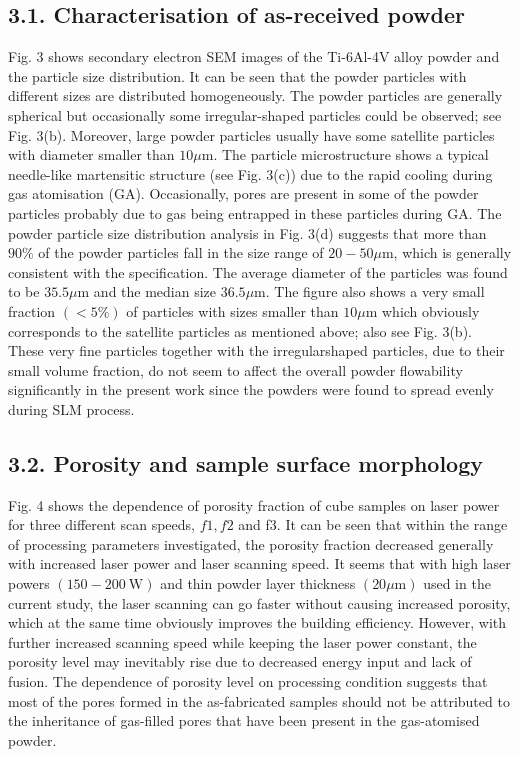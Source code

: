 \documentclass[10pt]{article}
\begin{document}
\subsection*{3.1. Characterisation of as-received powder}
Fig. 3 shows secondary electron SEM images of the Ti-6Al-4V alloy powder and the particle size distribution. It can be seen that the powder particles with different sizes are distributed homogeneously. The powder particles are generally spherical but occasionally some irregular-shaped particles could be observed; see Fig. 3(b). Moreover, large powder particles usually have some satellite particles with diameter smaller than $10 \mu \mathrm{m}$. The particle microstructure shows a typical needle-like martensitic structure (see Fig. 3(c)) due to the rapid cooling during gas atomisation (GA). Occasionally, pores are present in some of the powder particles probably due to gas being entrapped in these particles during GA. The powder particle size distribution analysis in Fig. 3(d) suggests that more than $90 \%$ of the powder particles fall in the size range of $20-50 \mu \mathrm{m}$, which is generally consistent with the specification. The average diameter of the particles was found to be $35.5 \mu \mathrm{m}$ and the median size $36.5 \mu \mathrm{m}$. The figure also shows a very small fraction $(<5 \%)$ of particles with sizes smaller than $10 \mu \mathrm{m}$ which obviously corresponds to the satellite particles as mentioned above; also see Fig. 3(b). These very fine particles together with the irregularshaped particles, due to their small volume fraction, do not seem to affect the overall powder flowability significantly in the present work since the powders were found to spread evenly during SLM process.

\subsection*{3.2. Porosity and sample surface morphology}
Fig. 4 shows the dependence of porosity fraction of cube samples on laser power for three different scan speeds, $f 1, f 2$ and f3. It can be seen that within the range of processing parameters investigated, the porosity fraction decreased generally with increased laser power and laser scanning speed. It seems that with high laser powers $(150-200 \mathrm{~W})$ and thin powder layer thickness $(20 \mu \mathrm{m})$ used in the current study, the laser scanning can go faster without causing increased porosity, which at the same time obviously improves the building efficiency. However, with further increased scanning speed while keeping the laser power constant, the porosity level may inevitably rise due to decreased energy input and lack of fusion. The dependence of porosity level on processing condition suggests that most of the pores formed in the as-fabricated samples should not be attributed to the inheritance of gas-filled pores that have been present in the gas-atomised powder.
\end{document}
